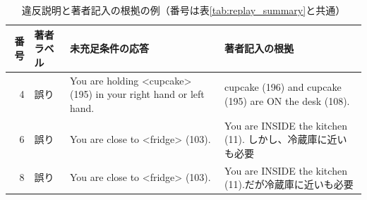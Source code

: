 \begin{table}[tb]
\caption{違反説明と著者記入の根拠の例（番号は表\ref{tab:replay_summary}と共通）}\label{tab:review_examples}
\centering\small
\begin{tabular}{rlp{}p{}}
\hline
番号 & 著者ラベル & 未充足条件の応答 & 著者記入の根拠 \\
\hline
4 & 誤り & You are holding \textless{}cupcake\textgreater{} (195) in your right hand or left hand. & cupcake (196) and cupcake (195) are ON the desk (108). \\
6 & 誤り & You are close to \textless{}fridge\textgreater{} (103). & You are INSIDE the kitchen (11). しかし、冷蔵庫に近いも必要 \\
8 & 誤り & You are close to \textless{}fridge\textgreater{} (103). & You are INSIDE the kitchen (11).だが冷蔵庫に近いも必要 \\
\hline
\end{tabular}
\end{table}
